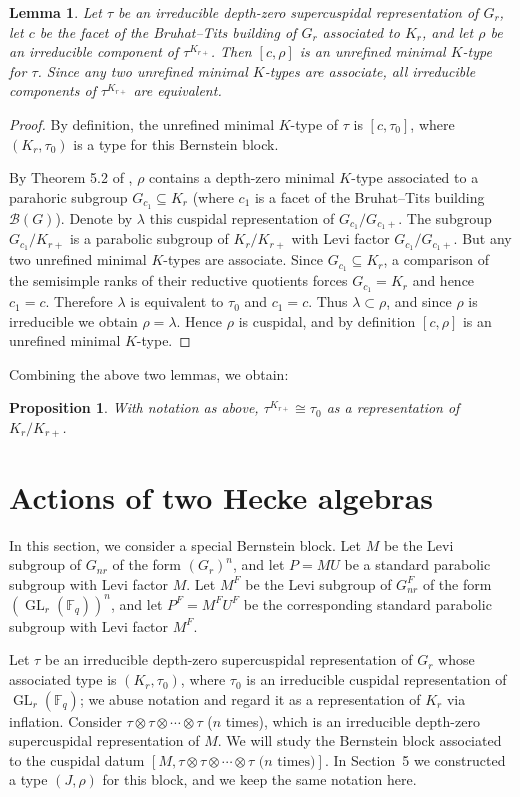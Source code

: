 \documentclass[12pt]{article}
\newtheorem{lemma}[theorem]{Lemma}
\newtheorem{proposition}[theorem]{Proposition}
\theoremstyle{remark}
\begin{document}
\begin{lemma}
Let $\tau$ be an irreducible depth-zero supercuspidal representation of $G_r$, let $c$ be the facet of the Bruhat--Tits building of $G_r$ associated to $K_r$, and let $\rho$ be an irreducible component of $\tau^{K_{r+}}$. Then $[c,\rho]$ is an unrefined minimal $K$-type for $\tau$. Since any two unrefined minimal $K$-types are associate, all irreducible components of $\tau^{K_{r+}}$ are equivalent.
\end{lemma}
\begin{proof}
By definition, the unrefined minimal $K$-type of $\tau$ is $[c,\tau_0]$, where $(K_r,\tau_0)$ is a type for this Bernstein block.

By Theorem 5.2 of \cite{MoyPrasad1994}, $\rho$ contains a depth-zero minimal $K$-type associated to a parahoric subgroup $G_{c_1} \subseteq K_r$ (where $c_1$ is a facet of the Bruhat--Tits building $\mathcal{B}(G)$). Denote by $\lambda$ this cuspidal representation of $G_{c_1}/G_{c_1+}$. The subgroup $G_{c_1}/K_{r+}$ is a parabolic subgroup of $K_r/K_{r+}$ with Levi factor $G_{c_1}/G_{c_1+}$. But any two unrefined minimal $K$-types are associate. Since $G_{c_1} \subseteq K_r$, a comparison of the semisimple ranks of their reductive quotients forces $G_{c_1} = K_r$ and hence $c_1 = c$. Therefore $\lambda$ is equivalent to $\tau_0$ and $c_1 = c$. Thus $\lambda \subset \rho$, and since $\rho$ is irreducible we obtain $\rho = \lambda$. Hence $\rho$ is cuspidal, and by definition $[c,\rho]$ is an unrefined minimal $K$-type.
\end{proof}

Combining the above two lemmas, we obtain:
\begin{proposition}
With notation as above, $\tau^{K_{r+}} \cong \tau_0$ as a representation of $K_r/K_{r+}$.
\end{proposition}

\section{Actions of two Hecke algebras}
In this section, we consider a special Bernstein block. Let $M$ be the Levi subgroup of $G_{nr}$ of the form $(G_r)^n$, and let $P=MU$ be a standard parabolic subgroup with Levi factor $M$. Let $M^F$ be the Levi subgroup of $G_{nr}^F$ of the form $(\operatorname{GL}_r(\mathbb{F}_q))^n$, and let $P^F = M^F U^F$ be the corresponding standard parabolic subgroup with Levi factor $M^F$.

Let $\tau$ be an irreducible depth-zero supercuspidal representation of $G_r$ whose associated type is $(K_r,\tau_0)$, where $\tau_0$ is an irreducible cuspidal representation of $\operatorname{GL}_r(\mathbb{F}_q)$; we abuse notation and regard it as a representation of $K_r$ via inflation. Consider $\tau \otimes \tau \otimes \cdots \otimes \tau$ ($n$ times), which is an irreducible depth-zero supercuspidal representation of $M$. We will study the Bernstein block associated to the cuspidal datum $[M, \tau \otimes \tau \otimes \cdots \otimes \tau \text{ ($n$ times)}]$. In Section~5 we constructed a type $(J,\rho)$ for this block, and we keep the same notation here.
\end{document}

